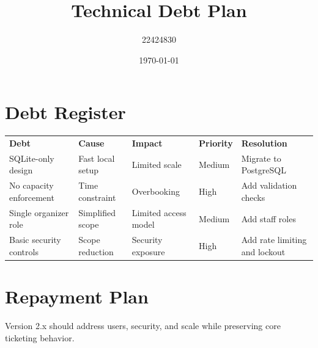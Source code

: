 \documentclass[11pt]{article}
\begin{document}
\title{Technical Debt Plan}
\author{22424830}
\date{\today}
\maketitle
\section{Debt Register}
\begin{longtable}{p{3cm}p{2.5cm}p{2.5cm}p{2.5cm}p{4cm}}
\textbf{Debt} & \textbf{Cause} & \textbf{Impact} & \textbf{Priority} & \textbf{Resolution} \\
SQLite-only design & Fast local setup & Limited scale & Medium & Migrate to PostgreSQL \\
No capacity enforcement & Time constraint & Overbooking & High & Add validation checks \\
Single organizer role & Simplified scope & Limited access model & Medium & Add staff roles \\
Basic security controls & Scope reduction & Security exposure & High & Add rate limiting and lockout \\
\end{longtable}
\section{Repayment Plan}
Version 2.x should address users, security, and scale while preserving core ticketing behavior.
\end{document}
